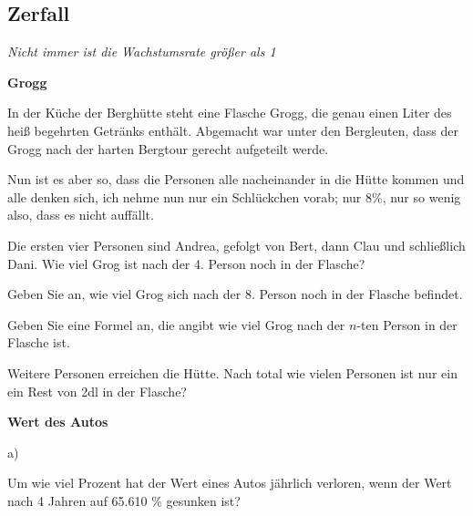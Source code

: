 \subsection{Zerfall}
\textit{Nicht immer ist die Wachstumsrate größer als 1}


\bbwActAufgabenNr{} \textbf{Grogg}

In der Küche der Berghütte steht eine Flasche Grogg, die genau einen Liter des
heiß begehrten Getränks enthält. Abgemacht war unter den Bergleuten,
dass der Grogg nach der harten Bergtour gerecht aufgeteilt werde.

Nun ist es aber so, dass die Personen alle nacheinander in die Hütte
kommen und alle denken sich, ich nehme nun nur ein Schlückchen vorab; 
nur 8\%, nur so wenig also, dass es nicht auffällt.

\begin{bbwAufgabenBlock}

\item Die ersten vier Personen sind Andrea, gefolgt von Bert, dann
  Clau und schließlich Dani.
  Wie viel Grog ist nach der 4. Person noch in der Flasche?

\item Geben Sie an, wie viel Grog sich nach der 8. Person noch in der
  Flasche befindet.

\item Geben Sie eine Formel an, die angibt wie viel Grog nach der
  $n$-ten Person in der Flasche ist.
  
\item Weitere Personen erreichen die Hütte. Nach total wie vielen Personen
  ist nur ein ein Rest von 2dl in der Flasche?
\end{bbwAufgabenBlock}
\platzFuerBerechnungenBisEndeSeite{}


\bbwActAufgabenNr{} \textbf{Wert des Autos}

a)

Um wie viel Prozent hat der Wert eines Autos jährlich verloren, wenn
der Wert nach 4 Jahren auf 65.610 \% gesunken ist?

